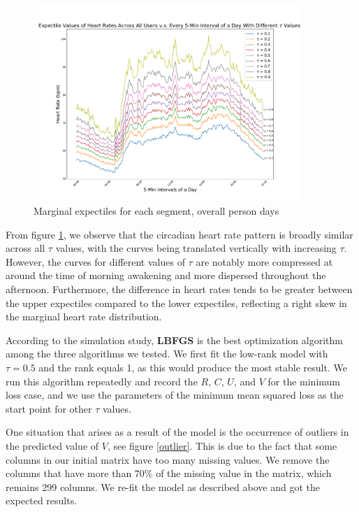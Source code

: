 \documentclass{article}
\begin{document}
\begin{figure}[ht]
\centering
\includegraphics[width=0.9\textwidth]{expectile_heartrate.pdf} 
\caption{Marginal expectiles for each segment, overall person days} 
\label{expectile heartrate} 
\end{figure}
From figure \ref{expectile heartrate}, we observe that
the circadian heart rate pattern is broadly similar across all $\tau$ values, with the curves being translated vertically with increasing $\tau$.  However, the curves for different values of $\tau$ are notably more compressed at around the time of morning awakening and more dispersed throughout the afternoon.  Furthermore, the difference in heart rates tends to be greater between the upper expectiles compared to the lower expectiles, reflecting a right skew in the marginal heart rate distribution.

According to the simulation study, \textbf{LBFGS} is the best optimization algorithm among the three algorithms we tested. We first fit the low-rank model with $\tau = 0.5$ and the rank equals 1,  as this would produce the most stable result. We run this algorithm repeatedly and record the $R$, $C$, $U$, and $V$ for the minimum loss case, and we use the parameters of the minimum mean squared loss as the start point for other $\tau$ values.

One situation that arises as a result of the model is the occurrence of outliers in the predicted value of $V$, see figure \ref{outlier}.
This is due to the fact that some columns in our initial matrix have too many missing values. We remove the columns that have more than $70\%$ of the missing value in the matrix, which remains 299 columns. We re-fit the model as described above and got the expected results.
\end{document}
